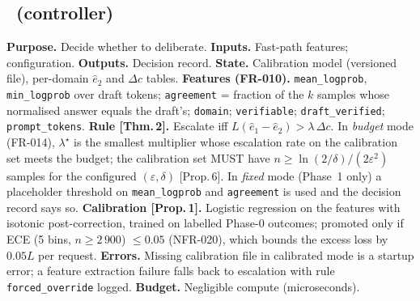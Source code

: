 \documentclass[11pt,a4paper]{article}
\begin{document}
\subsection{\Gate\ (controller)}
\textbf{Purpose.} Decide whether to deliberate. \textbf{Inputs.} Fast-path features; configuration. \textbf{Outputs.} Decision record. \textbf{State.} Calibration model (versioned file), per-domain $\hat e_2$ and $\Delta c$ tables. \textbf{Features (FR-010).} \texttt{mean\_logprob}, \texttt{min\_logprob} over draft tokens; \texttt{agreement} = fraction of the $k$ samples whose normalised answer equals the draft's; \texttt{domain}; \texttt{verifiable}; \texttt{draft\_verified}; \texttt{prompt\_tokens}. \textbf{Rule [Thm.\,2].} Escalate iff $L(\hat e_1-\hat e_2)>\lambda\,\Delta c$. In \emph{budget} mode (FR-014), $\lambda^\star$ is the smallest multiplier whose escalation rate on the calibration set meets the budget; the calibration set MUST have $n\ge\ln(2/\delta)/(2\varepsilon^2)$ samples for the configured $(\varepsilon,\delta)$ [Prop.\,6]. In \emph{fixed} mode (Phase~1 only) a placeholder threshold on \texttt{mean\_logprob} and \texttt{agreement} is used and the decision record says so. \textbf{Calibration [Prop.\,1].} Logistic regression on the features with isotonic post-correction, trained on labelled Phase-0 outcomes; promoted only if ECE (5 bins, $n\ge2\,900$) $\le0.05$ (NFR-020), which bounds the excess loss by $0.05L$ per request. \textbf{Errors.} Missing calibration file in calibrated mode is a startup error; a feature extraction failure falls back to escalation with rule \texttt{forced\_override} logged. \textbf{Budget.} Negligible compute (microseconds).
\end{document}
